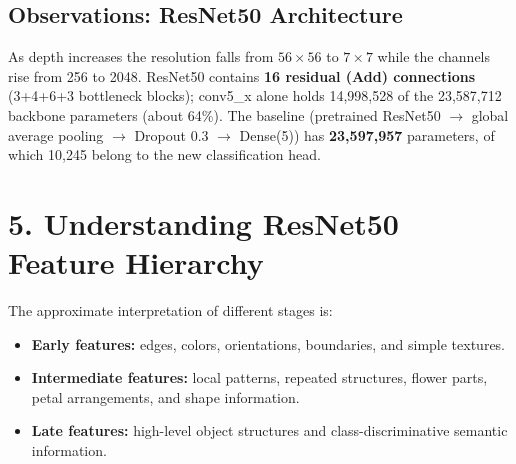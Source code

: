 \documentclass[10pt]{article}
\begin{document}
\subsection*{Observations: ResNet50 Architecture}
\begin{table}[H]
\centering
\caption{Measured ResNet50 stage hierarchy (ImageNet weights, $224\times224\times3$ input). All four positions match the table of Section 7.}
\scriptsize
{}
\end{table}

As depth increases the resolution falls from $56\times56$ to $7\times7$ while the channels rise from 256 to 2048. ResNet50 contains \textbf{16 residual (Add) connections} (3+4+6+3 bottleneck blocks); conv5\_x alone holds 14{,}998{,}528 of the 23{,}587{,}712 backbone parameters (about 64\%). The baseline (pretrained ResNet50 $\to$ global average pooling $\to$ Dropout 0.3 $\to$ Dense(5)) has \textbf{23{,}597{,}957} parameters, of which 10{,}245 belong to the new classification head.


\section*{5. Understanding ResNet50 Feature Hierarchy}

The approximate interpretation of different stages is:

\begin{itemize}

\item \textbf{Early features:}
edges, colors, orientations, boundaries, and simple textures.

\item \textbf{Intermediate features:}
local patterns, repeated structures, flower parts, petal arrangements, and
shape information.

\item \textbf{Late features:}
high-level object structures and class-discriminative semantic information.

\end{itemize}
\end{document}
